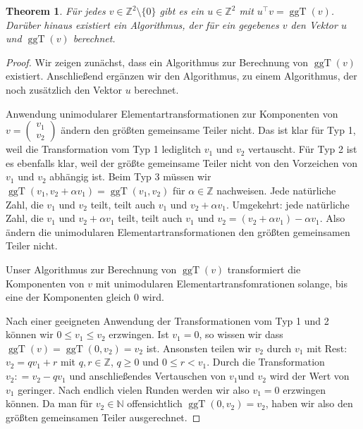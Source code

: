 \documentclass[
a4paper,12pt,
bibliography=totocnumbered,
numbers=noenddot,
]{scrartcl}
\numberwithin{equation}{subsection}
\newcommand{\N}{\mathbb N}
\newcommand{\Z}{\mathbb Z}
\newcommand{\ggT}{\operatorname{ggT}} %
\theoremstyle{plain}
\newtheorem*{thm}{Theorem}
\theoremstyle{definition}
\begin{document}
\begin{thm} 
	Für jedes $v \in \Z^2 \setminus \{0\}$ gibt es ein $u \in \Z^2$ mit $u^\top v = \ggT(v)$. Darüber hinaus existiert ein Algorithmus, der für ein gegebenes $v$ den Vektor $u$ und $\ggT(v)$ berechnet. 
\end{thm} 
\begin{proof} 
	Wir zeigen zunächst, dass ein Algorithmus zur Berechnung von $\ggT(v)$ existiert. Anschließend ergänzen wir den Algorithmus, zu einem Algorithmus, der noch zusätzlich den Vektor $u$ berechnet. 


	Anwendung unimodularer Elementartransformationen zur Komponenten von  $v = \begin{pmatrix} v_1 \\ v_2 \end{pmatrix}$ ändern den größten gemeinsame Teiler nicht. Das ist klar für Typ 1, weil die Transformation vom Typ 1 lediglitch $v_1$ und $v_2$ vertauscht. Für Typ 2 ist es ebenfalls klar, weil der größte gemeinsame Teiler nicht von den Vorzeichen von $v_1$ und $v_2$ abhängig ist. Beim Typ 3 müssen wir $\ggT(v_1, v_2 + \alpha v_1) = \ggT(v_1,v_2)$ für $\alpha \in \Z$ nachweisen. Jede natürliche Zahl, die $v_1$ und $v_2$ teilt, teilt auch $v_1$ und $v_2 + \alpha v_1$. Umgekehrt: jede natürliche Zahl, die $v_1$ und $v_2+ \alpha v_1$ teilt, teilt auch $v_1$ und $v_2 = (v_2+ \alpha v_1) - \alpha v_1$. Also ändern die unimodularen Elementartransformationen den größten gemeinsamen Teiler nicht. 
	
	Unser Algorithmus zur Berechnung von $\ggT(v)$ transformiert die Komponenten von $v$ mit unimodularen Elementartransfomrationen solange, bis eine der Komponenten gleich $0$ wird.  

	
	Nach einer geeigneten Anwendung der Transformationen vom Typ 1 und 2 können wir $0 \le v_1 \le v_2$ erzwingen. Ist $v_1=0$, so wissen wir dass $\ggT(v) = \ggT(0,v_2) = v_2$ ist. Ansonsten teilen wir $v_2$ durch $v_1$ mit Rest: $v_2 = q v_1 + r$ mit $q,r \in \Z$, $q \ge 0$ und $0 \le r < v_1$. Durch die Transformation $v_2 : = v_2 - q v_1$ und anschließendes Vertauschen von $v_1$und $v_2$ wird der Wert von $v_1$ geringer. Nach endlich vielen Runden werden wir also $v_1=0$ erzwingen können. Da man für $v_2 \in \N$ offensichtlich $\ggT(0,v_2) = v_2$, haben wir also den größten gemeinsamen Teiler ausgerechnet. 
	

\end{proof}
\end{document}
